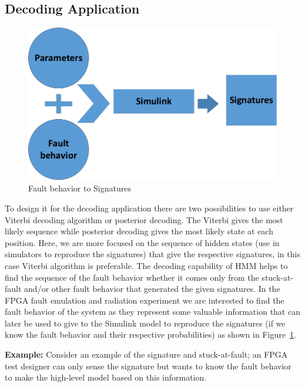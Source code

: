 \subsection{Decoding Application}
\begin{figure}[tb!]
 \centering
  \captionsetup{justification=centering}    
   \includegraphics[scale=0.8]{Figures/fromhiddentosignature.pdf}
   \caption{Fault behavior to Signatures}
\label{fig:HMMsig}
\end{figure}
To design it for the decoding application there are two possibilities to use either Viterbi decoding algorithm or  posterior decoding. The Viterbi gives the most likely sequence while posterior decoding gives the most likely state at each position. Here, we are more focused on the sequence of hidden states (use in simulators to reproduce the signatures) that give the respective signatures, in this case Viterbi algorithm is preferable. The decoding capability of HMM helps to find the sequence of the fault behavior whether it comes only from the stuck-at-fault and/or other fault behavior that generated the given signatures. In the FPGA fault emulation and radiation experiment we are interested to find the fault behavior of the system as they represent some valuable information that can later be used to give to the Simulink model to reproduce the signatures (if we know the fault behavior and their respective probabilities) as shown in Figure~\ref{fig:HMMsig}.

 
\textbf{Example:} Consider an example of the signature and stuck-at-fault; an FPGA test designer can only sense the signature but wants to know the fault behavior to make the high-level model based on this information.



